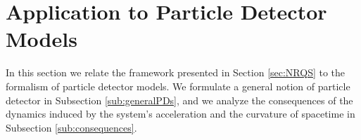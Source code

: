 \documentclass[prd,twocolumn,superscriptaddress,floatfix,amsmath,amssymb,amsfonts,longbibliography,nofootinbib]{revtex4-1}
\newcommand{\ii}{\mathrm{i}}
\begin{document}

















\section{Application to Particle Detector Models}\label{sec:detectors}

In this section we relate the framework presented in Section \ref{sec:NRQS} to the formalism of particle detector models. We formulate a general notion of particle detector in Subsection \ref{sub:generalPDs}, and we analyze the consequences of the dynamics induced by the system's acceleration and the curvature of spacetime in Subsection \ref{sub:consequences}.
\end{document}
